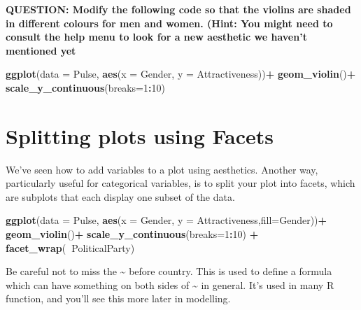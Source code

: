 \documentclass[]{book}
\newenvironment{Shaded}{\begin{snugshade}}{\end{snugshade}}
\newcommand{\DataTypeTok}[1]{\textcolor[rgb]{0.13,0.29,0.53}{#1}}
\newcommand{\DecValTok}[1]{\textcolor[rgb]{0.00,0.00,0.81}{#1}}
\newcommand{\KeywordTok}[1]{\textcolor[rgb]{0.13,0.29,0.53}{\textbf{#1}}}
\newcommand{\NormalTok}[1]{#1}
\newcommand{\OperatorTok}[1]{\textcolor[rgb]{0.81,0.36,0.00}{\textbf{#1}}}
\newcommand{\StringTok}[1]{\textcolor[rgb]{0.31,0.60,0.02}{#1}}
\begin{document}
\textbf{QUESTION: Modify the following code so that the violins are shaded in different colours for men and women. (Hint: You might need to consult the help menu to look for a new aesthetic we haven't mentioned yet}

\begin{Shaded}
\begin{Highlighting}[]
\KeywordTok{ggplot}\NormalTok{(}\DataTypeTok{data =}\NormalTok{ Pulse,  }\KeywordTok{aes}\NormalTok{(}\DataTypeTok{x =}\NormalTok{ Gender, }\DataTypeTok{y =}\NormalTok{ Attractiveness))}\OperatorTok{+}
\StringTok{  }\KeywordTok{geom_violin}\NormalTok{()}\OperatorTok{+}
\StringTok{    }\KeywordTok{scale_y_continuous}\NormalTok{(}\DataTypeTok{breaks=}\DecValTok{1}\OperatorTok{:}\DecValTok{10}\NormalTok{)}
\end{Highlighting}
\end{Shaded}

\hypertarget{splitting-plots-using-facets}{%
\section{Splitting plots using Facets}\label{splitting-plots-using-facets}}

We've seen how to add variables to a plot using aesthetics. Another way, particularly useful for categorical variables, is to split your plot into facets, which are subplots that each display one subset of the data.

\begin{Shaded}
\begin{Highlighting}[]
\KeywordTok{ggplot}\NormalTok{(}\DataTypeTok{data =}\NormalTok{ Pulse,  }\KeywordTok{aes}\NormalTok{(}\DataTypeTok{x =}\NormalTok{ Gender, }\DataTypeTok{y =}\NormalTok{ Attractiveness,}\DataTypeTok{fill=}\NormalTok{Gender))}\OperatorTok{+}
\StringTok{  }\KeywordTok{geom_violin}\NormalTok{()}\OperatorTok{+}
\StringTok{    }\KeywordTok{scale_y_continuous}\NormalTok{(}\DataTypeTok{breaks=}\DecValTok{1}\OperatorTok{:}\DecValTok{10}\NormalTok{) }\OperatorTok{+}
\StringTok{      }\KeywordTok{facet_wrap}\NormalTok{(}\OperatorTok{~}\NormalTok{PoliticalParty)}
\end{Highlighting}
\end{Shaded}

Be careful not to miss the \textasciitilde{} before country. This is used to define a formula which can have something on both sides of \textasciitilde{} in general. It's used in many R function, and you'll see this more later in modelling.
\end{document}
